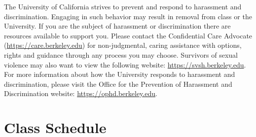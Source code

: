 \documentclass[letterpaper]{inzane_syllabus} %
\begin{document}
The University of California strives to prevent and respond to harassment and discrimination. Engaging in such behavior may result in removal from class or the University. If you are the subject of harassment or discrimination there are resources available to support you. Please contact the Confidential Care Advocate (\url{https://care.berkeley.edu}) for non-judgmental, caring assistance with options, rights and guidance through any process you may choose. Survivors of sexual violence may also want to view the following website: \url{https://svsh.berkeley.edu}.
For more information about how the University responds to harassment and discrimination, please visit the Office for the Prevention of Harassment and Discrimination website: \url{https://ophd.berkeley.edu}.\\

\newpage
\makeFullPage
\section{Class Schedule}
\end{document}
